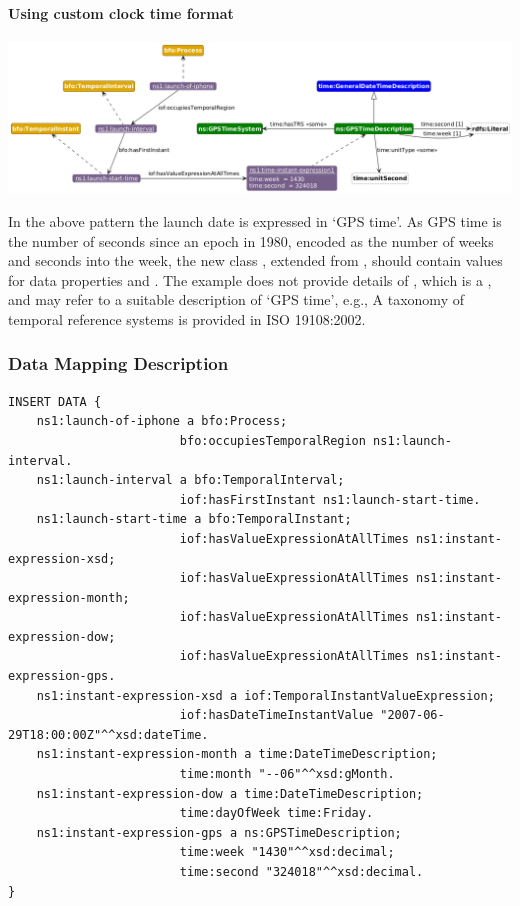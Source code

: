 \paragraph{Using custom clock time format \\}

\includegraphics[scale=0.35]{scenarios/clock-time-calendar-date/images/uc1-custom.png}

In the above pattern the launch date is expressed in `GPS time'. As GPS time is the number of seconds since an epoch in 1980, encoded as the number of weeks and seconds into the week, the new class  , extended from , should contain values for data properties  and . The example does not provide details of , which is a , and may refer to a suitable description of `GPS time', e.g., A taxonomy of temporal reference systems is provided in ISO 19108:2002. 


\subsubsection*{Data Mapping Description}

\begin{verbatim}
INSERT DATA {
    ns1:launch-of-iphone a bfo:Process;
                        bfo:occupiesTemporalRegion ns1:launch-interval.
    ns1:launch-interval a bfo:TemporalInterval;
                        iof:hasFirstInstant ns1:launch-start-time.
    ns1:launch-start-time a bfo:TemporalInstant;
                        iof:hasValueExpressionAtAllTimes ns1:instant-expression-xsd;
                        iof:hasValueExpressionAtAllTimes ns1:instant-expression-month;
                        iof:hasValueExpressionAtAllTimes ns1:instant-expression-dow;
                        iof:hasValueExpressionAtAllTimes ns1:instant-expression-gps.
    ns1:instant-expression-xsd a iof:TemporalInstantValueExpression;
                        iof:hasDateTimeInstantValue "2007-06-29T18:00:00Z"^^xsd:dateTime.
    ns1:instant-expression-month a time:DateTimeDescription;
                        time:month "--06"^^xsd:gMonth.
    ns1:instant-expression-dow a time:DateTimeDescription;
                        time:dayOfWeek time:Friday.
    ns1:instant-expression-gps a ns:GPSTimeDescription;
                        time:week "1430"^^xsd:decimal;
                        time:second "324018"^^xsd:decimal. 
}
\end{verbatim}

